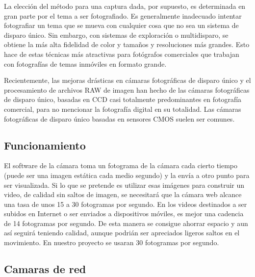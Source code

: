 \documentclass[12pt,a4paper]{report}
\begin{document}
La elección del método para una captura dada, por supuesto, es determinada en
gran parte por el tema a ser fotografiado. Es generalmente inadecuado intentar
fotografiar un tema que se mueva con cualquier cosa que no sea un sistema de
disparo único. Sin embargo, con sistemas de exploración o multidisparo, se
obtiene la más alta fidelidad de color y tamaños y resoluciones más grandes.
Esto hace de estas técnicas más atractivas para fotógrafos comerciales que
trabajan con fotografías de temas inmóviles en formato grande.

Recientemente, las mejoras drásticas en cámaras fotográficas de disparo único y
el procesamiento de archivos RAW de imagen han hecho de las cámaras fotográficas
de disparo único, basadas en CCD casi totalmente predominantes en fotografía
comercial, para no mencionar la fotografía digital en su totalidad. Las cámaras
fotográficas de disparo único basadas en sensores CMOS suelen ser comunes.

\subsection{Funcionamiento}

El software de la cámara toma un fotograma de la cámara cada cierto tiempo
(puede ser una imagen estática cada medio segundo) y la envía a otro punto para
ser visualizada. Si lo que se pretende es utilizar esas imágenes para construir
un video, de calidad sin saltos de imagen, se necesitará que la cámara web
alcance una tasa de unos 15 a 30 fotogramas por segundo.
En los videos destinados a ser subidos en Internet o ser enviados a dispositivos
móviles, es mejor una cadencia de 14 fotogramas por segundo. De esta manera se
consigue ahorrar espacio y aun así seguirá teniendo calidad, aunque podrián ser
apreciados ligeros saltos en el movimiento. En nuestro proyecto se usaran 30
fotogramas por segundo.

\subsection{Camaras de red}
\end{document}
